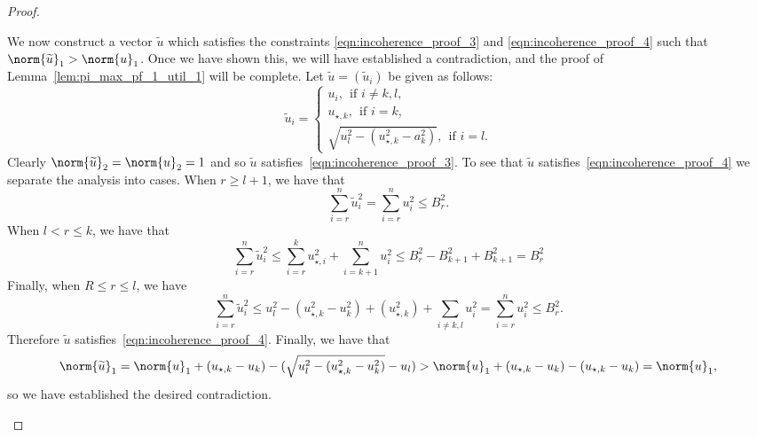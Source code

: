 \documentclass{article}
\newcommand{\1}{\mathbf{1}}
\newcommand{\wt}[1]{\widetilde{#1}}
\theoremstyle{alden}
\theoremstyle{aldenthm}
\theoremstyle{definition}
\theoremstyle{remark}
\begin{document}
\begin{proof}
\begin{itemize}
		We now construct a vector $\wt{u}$ which satisfies the constraints \eqref{eqn:incoherence_proof_3} and \eqref{eqn:incoherence_proof_4} such that $\norm{\wt{u}}_1 > \norm{u}_1$. Once we have shown this, we will have established a contradiction, and the proof of Lemma~\ref{lem:pi_max_pf_1_util_1} will be complete. Let $\wt{u} = (\wt{u}_i)$ be given as follows:
		\begin{equation*}
		\wt{u}_i = 
		\begin{cases*}
		u_i, ~~\textrm{if $i \neq k,l$}, \\
		u_{\star,k}, ~~\textrm{if $i = k$}, \\
		\sqrt{u_l^2 - (u_{\star,k}^2 - a_k^2)}, ~~\textrm{if $i = l$.}
		\end{cases*}
		\end{equation*}
		Clearly $\norm{\wt{u}}_2 = \norm{u}_2 = 1$ and so $\wt{u}$ satisfies~\eqref{eqn:incoherence_proof_3}. To see that $\wt{u}$ satisfies~\eqref{eqn:incoherence_proof_4} we separate the analysis into cases. When $r \geq l + 1$, we have that
		\begin{equation*}
		\sum_{i = r}^{n} \wt{u}_i^2 = \sum_{i = r}^{n} u_i^2 \leq B_r^2.
		\end{equation*}
		When $l < r \leq k$, we have that
		\begin{equation*}
		\sum_{i = r}^{n} \wt{u}_i^2 \leq \sum_{i = r}^{k} u_{\star,i}^2 + \sum_{i = k +1}^{n} u_{i}^2 \leq B_r^2 - B_{k + 1}^2 + B_{k + 1}^2 = B_r^2
		\end{equation*}
		Finally, when $R \leq r \leq l$, we have
		\begin{equation*}
		\sum_{i = r}^{n} \wt{u}_i^2 \leq u_l^2 - (u_{\star,k}^2 - u_k^2) + (u_{\star,k}^2) + \sum_{i \neq k,l} u_i^2 = \sum_{i = r}^{n} u_i^2 \leq B_r^2.
		\end{equation*}
		Therefore $\wt{u}$ satisfies~\eqref{eqn:incoherence_proof_4}. Finally, we have that
		\begin{equation*}
		\norm{\wt{u}}_1 = \norm{u}_1 + (u_{\star,k}  - u_k) - (\sqrt{u_l^2 - (u_{\star,k}^2 - u_k^2)} - u_l) > \norm{u}_1 + (u_{\star,k}  - u_k) - (u_{\star,k}  - u_k) = \norm{u}_1,
		\end{equation*}
		so we have established the desired contradiction.
	\end{itemize}
\end{proof}
\end{document}
